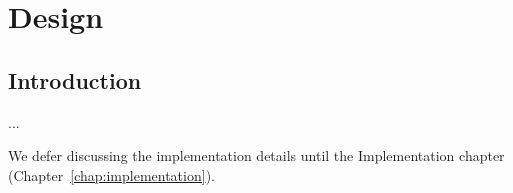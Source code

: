 

\chapter{Design}
\label{chap:design}

\section{Introduction}
\label{sec:designintroduction}

...

We defer discussing the implementation details until the Implementation chapter
(Chapter~\ref{chap:implementation}).


